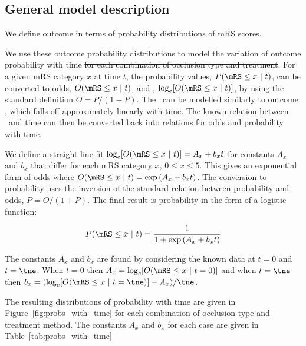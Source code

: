 \subsection{General model description}




We define outcome in terms of probability distributions of mRS scores. 


We use these outcome probability distributions to model the variation of outcome probability with time \sout{for each combination of occlusion type and treatment}.
% 
For a given mRS category $x$ at time $t$, the probability values, $P(\mRS\leq x\ |\ t)$, can be converted to odds, $O(\mRS\leq x\ |\ t)$, and \logodds, $\log_e[O(\mRS\leq x\ |\ t)]$, by using the standard definition $O=P/(1-P)$.
The \logodds\ can be modelled similarly to outcome \logoddsratio, which falls off approximately linearly with time\cite{emberson_effect_2014, fransen_time_2016}. 
% 
The known relation between \logodds\ and time can then be converted back into relations for odds and probability with time.

We define a straight line fit $\log_e[O(\mRS\leq x\ |\ t)] = A_x + b_x t$
for constants $A_x$ and $b_x$ that differ for each mRS category $x$, $0\leq x \leq5$.
This gives an exponential form of odds where $O(\mRS\leq x\ |\ t) = \exp{(A_x + b_x t)}$.
The conversion to probability uses the inversion of the standard relation between probability and odds,  $P=O/(1+P)$. 
The final result is probability in the form of a logistic function:

\begin{equation}
P(\mRS\leq x\ |\ t) = \frac{1}{1+\exp{(A_x + b_x t)}}
\end{equation}


The constants $A_x$ and $b_x$ are found by considering the known data at $t=0$ and $t=\tne$. 
When $t=0$ then $A_x = \log_e[O(\mRS\leq x\ |\ t=0)]$ and when $t=\tne$ then $b_x = (\log_e[O(\mRS\leq x\ |\ t=\tne)] - A_x) / \tne$. 

The resulting distributions of probability with time are given in Figure~\ref{fig:probs_with_time} for each combination of occlusion type and treatment method.  The constants $A_x$ and $b_x$ for each case are given in Table~\ref{tab:probs_with_time} 

